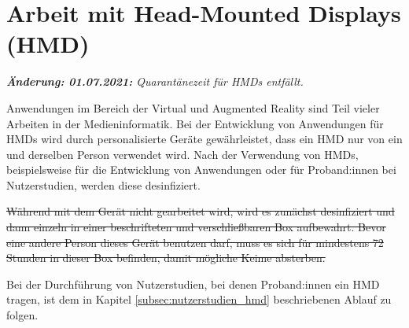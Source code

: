 \section{Arbeit mit Head-Mounted Displays (HMD)}\label{sec:hmd}
\emph{\textbf{Änderung: 01.07.2021:} Quarantänezeit für HMDs entfällt.}

\medskip
\noindent
Anwendungen im Bereich der Virtual und Augmented Reality sind Teil vieler Arbeiten in der Medieninformatik.
Bei der Entwicklung von Anwendungen für HMDs wird durch personalisierte Geräte gewährleistet, dass ein HMD nur von ein und derselben Person verwendet wird.
Nach der Verwendung von HMDs, beispielsweise für die Entwicklung von Anwendungen oder für Proband:innen bei Nutzerstudien, werden diese desinfiziert.

\sout{Während mit dem Gerät nicht gearbeitet wird, wird es zunächst desinfiziert und dann einzeln in einer beschrifteten und verschließbaren Box aufbewahrt. Bevor eine andere Person dieses Gerät benutzen darf, muss es sich für mindestens 72 Stunden in dieser Box befinden, damit mögliche Keime absterben.}

\medskip
\noindent
Bei der Durchführung von Nutzerstudien, bei denen Proband:innen ein HMD tragen, ist dem in Kapitel \ref{subsec:nutzerstudien_hmd} beschriebenen Ablauf zu folgen.
